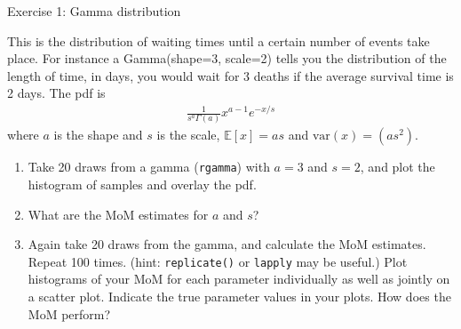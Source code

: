 \documentclass[12pt,xcolor=svgnames]{beamer}
\newcommand{\rd}{\color{red}}
\newcommand{\bl}{\color{blue}}
\newcommand{\theme}{\color{FireBrick}}
\newcommand{\ds}[1]{\mathds{#1}}
\newcommand{\sk}{\vspace{.4cm}}
\newcommand{\nochap}{\vspace{0.5cm}}
\newcommand{\chap}[1]{{\theme \Large \bf #1} \sk}
\newcommand{\E}{\ds{E}}
\newcommand{\var}{\text{var}}
\begin{document}
\iffalse
\begin{frame}
\nochap
{\bl Exercise 1: Binomial distribution}\\
{\scriptsize
Used to model the number of ``successes'' in a set of trials (e.g., number of heads when you flip a coin $N$ times). The pmf is 
\begin{align*}
{N \choose x} p^x(1-p)^{N-x}
\end{align*}
such that $\E[x]=Np$ (i.e., this is the theoretical mean). Imagine flipping 20 coins, so that $N=20$.
\begin{enumerate}
\item Take 50 draws from a binomial ({\bl \tt rbinom}) for one of $p\in $ 0.1, 0.5, 0.8 with $N=20$. Plot a histogram of how many successes (out of 20) you got for each of your 50 trials.
\item Calculate the method of moments (MoM) estimate for your? (hint: use the {\tt mean()} function) Is it close to the real value of $p$?
\item For the same value of $p$ take 30 draws from the binomial with $N=20$, and calculate the MoM estimator. Repeat 100 times, and make a histogram. (hint: {\tt replicate()} and {\tt lapply} may be useful.) Is the MoM successfully estimating $p$?
\end{enumerate}
}

\end{frame}
\fi

\begin{frame}
\nochap
{\bl Exercise 1: Gamma distribution}\\
{\scriptsize
This is the distribution of waiting times until a certain number of events take place. For instance a Gamma(shape=3, scale=2) tells you the distribution of the length of time, in days, you would wait for 3 deaths if the average survival time is 2 days. The pdf is 
\begin{align*}
\frac{1}{s^a\Gamma(a)}x^{a-1}e^{-x/s}
\end{align*}
where $a$ is the shape and $s$ is the scale, $\E[x]=as$ and $\var(x)=(as^2)$. 
\begin{enumerate}
\item Take 20 draws from a gamma ({\bl \tt rgamma}) with $a=3$ and $s=2$, and plot the histogram of samples and overlay the pdf.
\item What are the MoM estimates for $a$ and $s$?
\item Again take 20 draws from the gamma, and calculate the MoM estimates. Repeat 100 times. (hint: {\tt replicate()} or {\tt lapply} may be useful.) Plot histograms of your MoM for each parameter individually as well as jointly on a scatter plot. Indicate the true parameter values in your plots. How does the MoM perform?
\end{enumerate}
}

\end{frame}
\end{document}
